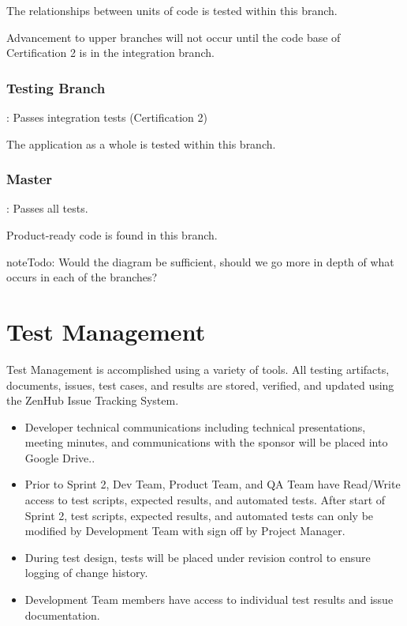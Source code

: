\documentclass[letterpaper,10pt,english]{sphinxmanual}
\begin{document}
The relationships between units of code is tested within this branch.

Advancement to upper branches will not occur until the code base of Certification 2 is in the integration branch.


\subsubsection{Testing Branch}
\label{\detokenize{test_plan/repository_management:testing-branch}}
: Passes integration tests (Certification 2)

The application as a whole is tested within this branch.


\subsubsection{Master}
\label{\detokenize{test_plan/repository_management:master}}
: Passes all tests.

Product-ready code is found in this branch.

\begin{sphinxadmonition}{note}{\label{test_plan/repository_management:index-0}Todo:}
Would the diagram be sufficient, should we go more in depth of what occurs in each of the branches?
\end{sphinxadmonition}


\section{Test Management}
\label{\detokenize{test_plan/test_management:test-management}}\label{\detokenize{test_plan/test_management::doc}}
Test Management is accomplished using a variety of tools. All testing artifacts, documents, issues, test cases, and results are stored, verified, and updated using the ZenHub Issue Tracking System.
\begin{itemize}
\item {} 
Developer technical communications including technical presentations, meeting minutes, and communications with the sponsor will be placed into Google Drive..

\item {} 
Prior to Sprint 2, Dev Team, Product Team, and QA Team have Read/Write access to test scripts, expected results, and automated tests.  After start of Sprint 2, test scripts, expected results, and automated tests can only be modified by Development Team with sign off by Project Manager.

\item {} 
During test design, tests will be placed under revision control to ensure logging of change history.

\item {} 
Development Team members have access to individual test results and issue documentation.

\end{itemize}
\end{document}
